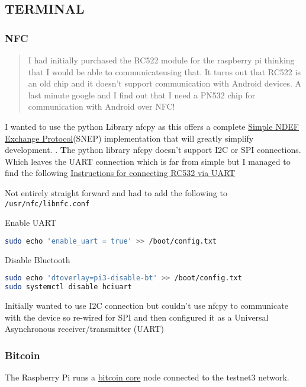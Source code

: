 \documentclass[a4paper]{article}
\begin{document}
\subsection{\textbf{TERMINAL}}
\subsubsection{NFC}

\begin{quote}
I had initially purchased the RC522 module for the raspberry pi thinking that I
would be able to communicateusing that.  It turns out that RC522 is an old
chip and it doesn't support communication with Android devices.  A last minute
google and I find out that I need a PN532 chip for communication with Android
over NFC!
\end{quote}

I wanted to use the python Library nfcpy as this offers a complete
\href{https://nfcpy.readthedocs.io/en/latest/topics/snep.html}{Simple NDEF Exchange
Protocol}(SNEP) implementation that will greatly simplify development.
.
{\textbf The python library nfcpy doesn't support I2C or SPI connections.} Which
leaves the UART connection which is far from simple but I managed to find the
following 
\href{https://learn.adafruit.com/adafruit-nfc-rfid-on-raspberry-pi/building-libnfc}
{Instructions for connecting RC532 via UART}

Not entirely straight forward and had to add the following to
\verb|/usr/nfc/libnfc.conf|

Enable UART
\begin{lstlisting}[language=bash]
sudo echo 'enable_uart = true' >> /boot/config.txt
\end{lstlisting}

Disable Bluetooth
\begin{lstlisting}[language=bash]
sudo echo 'dtoverlay=pi3-disable-bt' >> /boot/config.txt
sudo systemctl disable hciuart
\end{lstlisting}

Initially wanted to use I2C connection but couldn't use nfcpy to communicate with
the device so re-wired for SPI and then configured it as a Universal Asynchronous
receiver/transmitter (UART)

\subsubsection{Bitcoin}
The Raspberry Pi runs a \href{https://github.com/bitcoin/bitcoin}{bitcoin core} node
connected to the testnet3 network.
\end{document}
